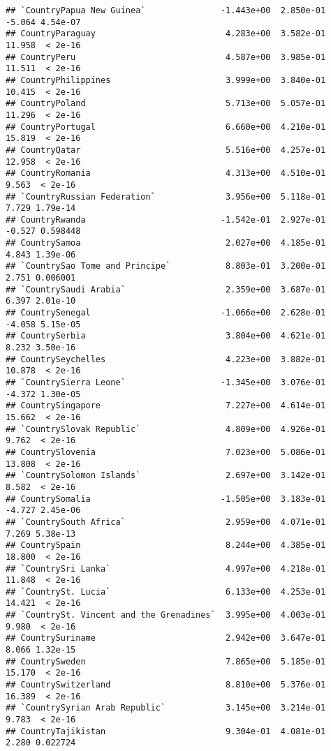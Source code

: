 \documentclass[
]{article}
\begin{document}
\begin{verbatim}
## `CountryPapua New Guinea`               -1.443e+00  2.850e-01  -5.064 4.54e-07
## CountryParaguay                          4.283e+00  3.582e-01  11.958  < 2e-16
## CountryPeru                              4.587e+00  3.985e-01  11.511  < 2e-16
## CountryPhilippines                       3.999e+00  3.840e-01  10.415  < 2e-16
## CountryPoland                            5.713e+00  5.057e-01  11.296  < 2e-16
## CountryPortugal                          6.660e+00  4.210e-01  15.819  < 2e-16
## CountryQatar                             5.516e+00  4.257e-01  12.958  < 2e-16
## CountryRomania                           4.313e+00  4.510e-01   9.563  < 2e-16
## `CountryRussian Federation`              3.956e+00  5.118e-01   7.729 1.79e-14
## CountryRwanda                           -1.542e-01  2.927e-01  -0.527 0.598448
## CountrySamoa                             2.027e+00  4.185e-01   4.843 1.39e-06
## `CountrySao Tome and Principe`           8.803e-01  3.200e-01   2.751 0.006001
## `CountrySaudi Arabia`                    2.359e+00  3.687e-01   6.397 2.01e-10
## CountrySenegal                          -1.066e+00  2.628e-01  -4.058 5.15e-05
## CountrySerbia                            3.804e+00  4.621e-01   8.232 3.50e-16
## CountrySeychelles                        4.223e+00  3.882e-01  10.878  < 2e-16
## `CountrySierra Leone`                   -1.345e+00  3.076e-01  -4.372 1.30e-05
## CountrySingapore                         7.227e+00  4.614e-01  15.662  < 2e-16
## `CountrySlovak Republic`                 4.809e+00  4.926e-01   9.762  < 2e-16
## CountrySlovenia                          7.023e+00  5.086e-01  13.808  < 2e-16
## `CountrySolomon Islands`                 2.697e+00  3.142e-01   8.582  < 2e-16
## CountrySomalia                          -1.505e+00  3.183e-01  -4.727 2.45e-06
## `CountrySouth Africa`                    2.959e+00  4.071e-01   7.269 5.38e-13
## CountrySpain                             8.244e+00  4.385e-01  18.800  < 2e-16
## `CountrySri Lanka`                       4.997e+00  4.218e-01  11.848  < 2e-16
## `CountrySt. Lucia`                       6.133e+00  4.253e-01  14.421  < 2e-16
## `CountrySt. Vincent and the Grenadines`  3.995e+00  4.003e-01   9.980  < 2e-16
## CountrySuriname                          2.942e+00  3.647e-01   8.066 1.32e-15
## CountrySweden                            7.865e+00  5.185e-01  15.170  < 2e-16
## CountrySwitzerland                       8.810e+00  5.376e-01  16.389  < 2e-16
## `CountrySyrian Arab Republic`            3.145e+00  3.214e-01   9.783  < 2e-16
## CountryTajikistan                        9.304e-01  4.081e-01   2.280 0.022724

\end{verbatim}
\end{document}
